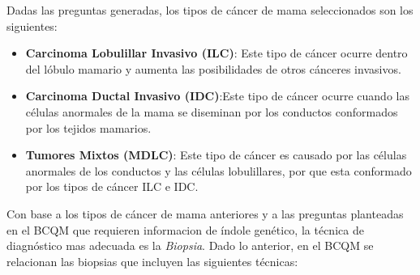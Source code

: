Dadas las preguntas generadas, los tipos de cáncer de mama seleccionados son los siguientes:
\begin{itemize}[label=\HandRight]
	\item \textbf{Carcinoma Lobulillar Invasivo (ILC)}:  Este tipo de cáncer ocurre dentro del lóbulo mamario y aumenta las posibilidades de otros cánceres invasivos. 
	\item \textbf{Carcinoma Ductal Invasivo (IDC)}:Este tipo de cáncer ocurre cuando las células anormales de la mama se diseminan por los conductos conformados por los tejidos mamarios.
	\item \textbf{Tumores Mixtos (MDLC)}: Este tipo de cáncer es causado por las células anormales de los conductos y las células lobulillares, por que esta conformado por los tipos de cáncer ILC e IDC.
\end{itemize}

Con base a los tipos de cáncer de mama anteriores y a las preguntas planteadas en el BCQM que requieren informacion de índole genético, la técnica de diagnóstico mas adecuada es la \textit{Biopsia}. Dado lo anterior, en el BCQM se relacionan las biopsias que incluyen las siguientes técnicas: 

